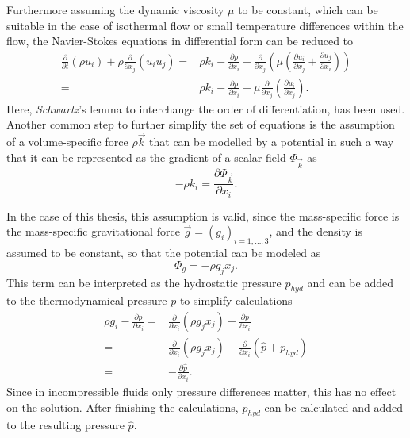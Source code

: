 Furthermore assuming the dynamic viscosity \(\mu\) to be constant, which can be suitable in the case of isothermal flow or small temperature differences within the flow, the Navier-Stokes equations in differential form can be reduced to 
\begin{subequations}
\label{eq:navierstokes}
\begin{align}
  \frac{\partial}{\partial t}   \left(\rho u_i \right)
  + \rho \frac{\partial}{\partial x_j} \left( u_i  u_j \right) 
  =& \rho k_i
  - \frac{\partial p}{\partial x_i}
+ \frac{\partial}{\partial x_j} \left( \mu  \left( \frac{\partial u_i}{\partial x_j} 
+ \frac{\partial u_j}{\partial x_i} \right) \right) \\[0.5em]
  =& \rho k_i
  - \frac{\partial p}{\partial x_i}
  + \mu \frac{\partial}{\partial x_j} \left( \frac{\partial u_i}{\partial x_j} \right).
\end{align}
\end{subequations}
Here, \emph{Schwartz}'s lemma to interchange the order of differentiation, has been used. Another common step to further simplify the set of equations is the assumption of a volume-specific force \(\rho \vec{k}\) that can be modelled by a potential in such a way that it can be represented as the gradient of a scalar field \(\Phi_\vec{k}\) as
\begin{displaymath}
 - \rho k_i = \frac{\partial \Phi_\vec{k}}{\partial x_i}.
\end{displaymath}

In the case of this thesis, this assumption is valid, since the mass-specific force is the mass-specific gravitational force \(\vec{g} = \left( g_i \right)_{i = 1,\dots,3}\), and the density is assumed to be constant, so that the potential can be modeled as
\begin{displaymath}
  \Phi_g = - \rho g_j x_j.
\end{displaymath}
This term can be interpreted as the hydrostatic pressure \(p_{hyd}\) and can be added to the thermodynamical pressure \(p\) to simplify calculations 
\begin{align*}
  \rho g_i - \frac{\partial p}{\partial x_i} 
  =& \frac{\partial}{\partial x_i} \left( \rho g_j x_j \right) - \frac{\partial p}{\partial x_i} \nonumber \\[0.5em]
  =& \frac{\partial}{\partial x_i} \left( \rho g_j x_j \right) - \frac{\partial}{\partial x_i}  \left(\hat{p} + p_{hyd} \right) \nonumber \\[0.5em]
  =& - \frac{\partial \hat{p}}{\partial x_i}.
\end{align*}
Since in incompressible fluids only pressure differences matter, this has no effect on the solution. After finishing the calculations, \(p_{hyd}\) can be calculated and added to the resulting pressure \(\hat{p}\).


